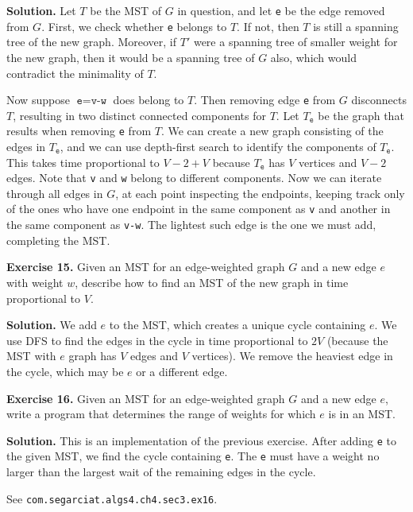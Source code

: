 \documentclass[12pt, a4paper]{article}
\newenvironment{ex}[2][Exercise]
{\par\medskip\noindent \textbf{#1 #2.}}
{\medskip}
\newenvironment{sol}[1][Solution]
{\par\medskip\noindent \textbf{#1.} }
{\medskip}
\begin{document}
	\begin{sol}
		Let $T$ be the MST of $G$ in question, and let \texttt{e} be the edge removed from $G$.
		First, we check whether \texttt{e} belongs to $T$. If not, then $T$ is still a spanning
		tree of the new graph. Moreover, if $T'$ were a spanning tree of smaller
		weight for the new graph, then it would be a spanning tree of $G$ also,
		which would contradict the minimality of $T$.
		
		Now suppose $\texttt{e}=\texttt{v-w}$ does belong to $T$. Then removing edge \texttt{e}
		from $G$ disconnects $T$, resulting in two distinct connected components for $T$.
		Let $T_{\texttt{e}}$ be the graph that results when removing \texttt{e} from $T$.
		We can create a new graph consisting of the edges in $T_{\texttt{e}}$,
		and we can use depth-first search to identify the components of $T_{\texttt{e}}$.
		This takes time proportional to $V-2 + V$ because $T_{\texttt{e}}$ has $V$
		vertices and $V-2$ edges. Note that \texttt{v} and \texttt{w} belong to different
		components. Now we can iterate through all edges in $G$, at each point inspecting
		the endpoints, keeping track only of the ones who have one endpoint in the same
		component as \texttt{v} and another in the same component as \texttt{v-w}. The
		lightest such edge is the one we must add, completing the MST.
	\end{sol}
	\begin{ex}{15}
		Given an MST for an edge-weighted graph $G$ and a new edge $e$ with weight $w$,
		describe how to find an MST of the new graph in time proportional to $V$.
	\end{ex}
	\begin{sol}
		We add $e$ to the MST, which creates a unique cycle containing $e$. We use
		DFS to find the edges in the cycle in time proportional to $2V$ (because the
		MST with $e$ graph has $V$ edges and $V$ vertices). We remove the heaviest
		edge in the cycle, which may be $e$ or a different edge.
	\end{sol}
	\begin{ex}{16}
		Given an MST for an edge-weighted graph $G$ and a new edge $e$, write a program
		that determines the range of weights for which $e$ is in an MST.
	\end{ex}
	\begin{sol}
		This is an implementation of the previous exercise. After adding \texttt{e} to
		the given MST, we find the cycle containing \texttt{e}. The \texttt{e} must
		have a weight no larger than the largest wait of the remaining edges in
		the cycle.
		
		See \texttt{com.segarciat.algs4.ch4.sec3.ex16}.
	\end{sol}
\end{document}
